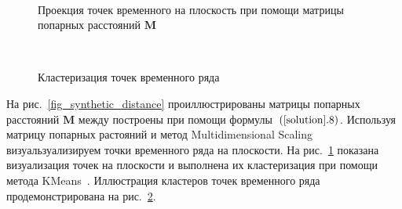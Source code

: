 \documentclass[12pt, twoside]{article}
\begin{document}
\begin{figure}[h!t]\center
{}
\\
\caption{Проекция точек временного на плоскость при помощи матрицы попарных расстояний $\textbf{M}$}
\label{fig_synthetic_2D}
\end{figure}


\begin{figure}[h!t]\center
{}
\\
\caption{Кластеризация точек временного ряда}
\label{fig_synthetic_claster}
\end{figure}

На рис.~\ref{fig_synthetic_distance} проиллюстрированы матрицы попарных расстояний $\textbf{M}$ между построены при помощи формулы~$(\ref{solution}.8)$. Используя матрицу попарных растояний и метод Multidimensional Scaling~\cite{Borg2005} визуальзуализируем точки временного ряда на плоскости. На рис.~\ref{fig_synthetic_2D} показана визуализация точек на плоскости и выполнена их кластеризация при помощи метода KMeans~\cite{Kanungo2000}. Иллюстрация кластеров точек временного ряда продемонстрирована на рис.~\ref{fig_synthetic_claster}.
\end{document}

